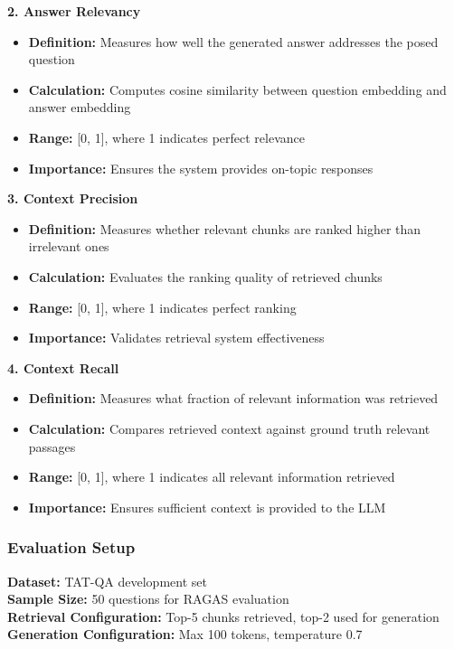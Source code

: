 \textbf{2. Answer Relevancy}
\begin{itemize}
    \item \textbf{Definition:} Measures how well the generated answer addresses the posed question
    \item \textbf{Calculation:} Computes cosine similarity between question embedding and answer embedding
    \item \textbf{Range:} [0, 1], where 1 indicates perfect relevance
    \item \textbf{Importance:} Ensures the system provides on-topic responses
\end{itemize}

\textbf{3. Context Precision}
\begin{itemize}
    \item \textbf{Definition:} Measures whether relevant chunks are ranked higher than irrelevant ones
    \item \textbf{Calculation:} Evaluates the ranking quality of retrieved chunks
    \item \textbf{Range:} [0, 1], where 1 indicates perfect ranking
    \item \textbf{Importance:} Validates retrieval system effectiveness
\end{itemize}

\textbf{4. Context Recall}
\begin{itemize}
    \item \textbf{Definition:} Measures what fraction of relevant information was retrieved
    \item \textbf{Calculation:} Compares retrieved context against ground truth relevant passages
    \item \textbf{Range:} [0, 1], where 1 indicates all relevant information retrieved
    \item \textbf{Importance:} Ensures sufficient context is provided to the LLM
\end{itemize}

\subsubsection{Evaluation Setup}

\textbf{Dataset:} TAT-QA development set\\
\textbf{Sample Size:} 50 questions for RAGAS evaluation\\
\textbf{Retrieval Configuration:} Top-5 chunks retrieved, top-2 used for generation\\
\textbf{Generation Configuration:} Max 100 tokens, temperature 0.7

